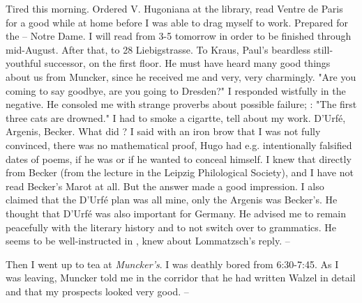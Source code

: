
\missing Tired this morning. Ordered V. Hugoniana at the library, read Ventre de Paris for a good while at home before I was able to drag myself to work. Prepared for the  -- Notre Dame. I will read from 3-5 tomorrow in order to be finished through mid-August. \missing After that, to 28 Liebigstrasse. To Kraus, Paul's beardless still-youthful successor, on the first floor. He must have heard many good things about us from Muncker, since he received me  and very, very charmingly. "Are you coming to say goodbye, are you going to Dresden?" I responded wistfully in the negative. He consoled me with strange proverbs about possible failure; : "The first three cats are drowned." I had to smoke a cigartte, tell about my work. D'Urfé, Argenis, Becker. What did ? I said with an iron brow that I was not fully convinced, there was no mathematical proof, Hugo had e.g. intentionally falsified dates of poems, if he was  or if he wanted to conceal himself. I knew that directly from Becker (from the lecture in the Leipzig Philological Society), and I have not read Becker's Marot at all. But the answer made a good impression. I also claimed that the D'Urfé plan was all mine, only the Argenis was Becker's. He thought that D'Urfé was also important for Germany. He advised me to remain peacefully with the literary history and to not switch over to grammatics. He seems to be well-instructed in , knew about Lommatzsch's reply. --

Then I went up to tea at \textit{Muncker's}. I was deathly bored from 6:30-7:45. As I was leaving, Muncker told me in the corridor that he had written Walzel in detail and that my prospects looked very good. -- 

\missing

%